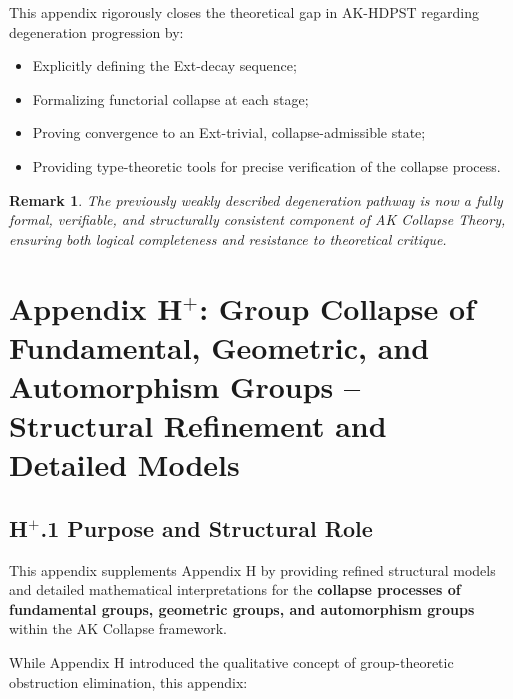 \documentclass[11pt]{article}
\newtheorem{remark}[theorem]{Remark}
\begin{document}
This appendix rigorously closes the theoretical gap in AK-HDPST regarding degeneration progression by:

\begin{itemize}
    \item Explicitly defining the Ext-decay sequence;
    \item Formalizing functorial collapse at each stage;
    \item Proving convergence to an Ext-trivial, collapse-admissible state;
    \item Providing type-theoretic tools for precise verification of the collapse process.
\end{itemize}

\begin{remark}
The previously weakly described degeneration pathway is now a fully formal, verifiable, and structurally consistent component of AK Collapse Theory, ensuring both logical completeness and resistance to theoretical critique.
\end{remark}




\section*{Appendix H$^{+}$: Group Collapse of Fundamental, Geometric, and Automorphism Groups – Structural Refinement and Detailed Models}

\subsection*{H$^{+}$.1 Purpose and Structural Role}

This appendix supplements Appendix H by providing refined structural models and detailed mathematical interpretations for the \textbf{collapse processes of fundamental groups, geometric groups, and automorphism groups} within the AK Collapse framework.

While Appendix H introduced the qualitative concept of group-theoretic obstruction elimination, this appendix:
\end{document}
